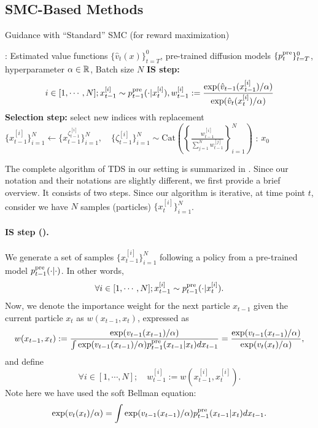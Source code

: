 \subsection{SMC-Based Methods}

\begin{algorithm}[!ht]
\caption{Guidance with ``Standard'' SMC (for reward maximization)}\label{alg:SMC}
\begin{algorithmic}[1]
     : Estimated value functions $\{\hat v_t(x)\}_{t=T}^0$, pre-trained diffusion models $\{p^{\mathrm{pre}}_t\}_{t=T}^0$, hyperparameter $\alpha \in \mathbb{R}$, Batch size $N$
       \STATE \textbf{IS step:}  \label{line:IS} 
       \STATE $$i \in [1,\cdots, N]; x^{[i]}_{t-1} \sim p^{\mathrm{pre}}_{t-1}(\cdot| x^{[i]}_{t}), w^{[i]}_{t-1}:= \frac{\exp(\hat v_{t-1}(x^{[i]}_{t-1})/\alpha )}{\exp(\hat v_t(x^{[i]}_{t})/\alpha )}$$
        \STATE \textbf{Selection step:} select new indices with replacement \label{line:selection}
       \STATE  $\{x^{[i]}_{t-1}\}_{i=1}^N  \leftarrow \{x^{\zeta^{[i]}_{t-1}}_{t-1}\}_{i=1}^N,\quad \{\zeta^{[i]}_{t-1}\}_{i=1}^N \sim \mathrm{Cat}\left ( \left \{\frac{w^{[i]}_{t-1}}{\sum_{j=1}^N w^{[j]}_{t-1} } \right \}_{i=1}^N \right)$
     \ENDFOR
  : $x_0$
\end{algorithmic}
\end{algorithm} 


The complete algorithm of TDS in our setting is summarized in . Since our notation and their notations are slightly different, we first provide a brief overview. It consists of two steps. Since our algorithm is iterative, at time point $t$, consider we have $N$ samples (particles) $\{x^{[i]}_{t}\}_{i=1}^N$. 


\paragraph{IS step ().} We generate a set of samples $\{x^{ [i] }_{t-1}\}_{i=1}^N$ following a policy from a pre-trained model  $p^{\mathrm{pre}}_{t-1}(\cdot|\cdot)$. In other words, 
\begin{align*}
 \forall i \in [1,\cdots,N];  x^{[i]}_{t-1} \sim p^{\mathrm{pre}}_{t-1}(\cdot|x^{[i]}_{t}). 
\end{align*} 
Now, we denote the importance weight for the next particle $x_{t-1}$ given the current particle $x_{t}$ as $w(x_{t-1}, x_{t})$, expressed as
\begin{align*}
    w(x_{t-1},x_{t}):=\frac{\exp(v_{t-1}(x_{t-1})/\alpha ) }{\int \exp(v_{t-1}(x_{t-1})/\alpha)p^{\mathrm{pre}}_{t-1}(x_{t-1}|x_{t}) dx_{t-1} }=\frac{\exp(v_{t-1}(x_{t-1})/\alpha) }{ \exp(v_{t}(x_{t})/\alpha) },  
\end{align*}
and define $$\forall i \in [1,\cdots,N];\quad  w^{[i]}_{t-1}:=w(x^{[i]}_{t-1},x^{[i]}_{t}). $$
Note here we have used the soft Bellman equation:
\begin{align*}
        \exp(v_t(x_t)/\alpha )=\int \exp(v_{t-1}(x_{t-1})/\alpha )p^{\mathrm{pre}}_{t-1}(x_{t-1}|x_{t}) dx_{t-1}. 
\end{align*}


